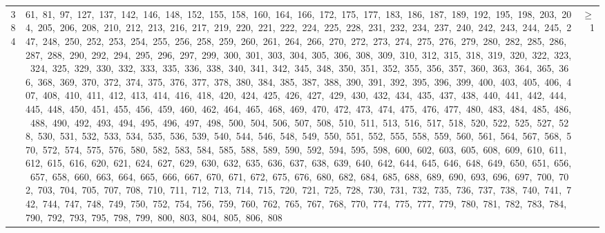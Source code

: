 \begin{longtable}{c|p{}|r}
384 & 61,\ 81,\ 97,\ 127,\ 137,\ 142,\ 146,\ 148,\ 152,\ 155,\ 158,\ 160,\ 164,\ 166,\ 172,\ 175,\ 177,\ 183,\ 186,\ 187,\ 189,\ 192,\ 195,\ 198,\ 203,\ 204,\ 205,\ 206,\ 208,\ 210,\ 212,\ 213,\ 216,\ 217,\ 219,\ 220,\ 221,\ 222,\ 224,\ 225,\ 228,\ 231,\ 232,\ 234,\ 237,\ 240,\ 242,\ 243,\ 244,\ 245,\ 247,\ 248,\ 250,\ 252,\ 253,\ 254,\ 255,\ 256,\ 258,\ 259,\ 260,\ 261,\ 264,\ 266,\ 270,\ 272,\ 273,\ 274,\ 275,\ 276,\ 279,\ 280,\ 282,\ 285,\ 286,\ 287,\ 288,\ 290,\ 292,\ 294,\ 295,\ 296,\ 297,\ 299,\ 300,\ 301,\ 303,\ 304,\ 305,\ 306,\ 308,\ 309,\ 310,\ 312,\ 315,\ 318,\ 319,\ 320,\ 322,\ 323,\ 324,\ 325,\ 329,\ 330,\ 332,\ 333,\ 335,\ 336,\ 338,\ 340,\ 341,\ 342,\ 345,\ 348,\ 350,\ 351,\ 352,\ 355,\ 356,\ 357,\ 360,\ 363,\ 364,\ 365,\ 366,\ 368,\ 369,\ 370,\ 372,\ 374,\ 375,\ 376,\ 377,\ 378,\ 380,\ 384,\ 385,\ 387,\ 388,\ 390,\ 391,\ 392,\ 395,\ 396,\ 399,\ 400,\ 403,\ 405,\ 406,\ 407,\ 408,\ 410,\ 411,\ 412,\ 413,\ 414,\ 416,\ 418,\ 420,\ 424,\ 425,\ 426,\ 427,\ 429,\ 430,\ 432,\ 434,\ 435,\ 437,\ 438,\ 440,\ 441,\ 442,\ 444,\ 445,\ 448,\ 450,\ 451,\ 455,\ 456,\ 459,\ 460,\ 462,\ 464,\ 465,\ 468,\ 469,\ 470,\ 472,\ 473,\ 474,\ 475,\ 476,\ 477,\ 480,\ 483,\ 484,\ 485,\ 486,\ 488,\ 490,\ 492,\ 493,\ 494,\ 495,\ 496,\ 497,\ 498,\ 500,\ 504,\ 506,\ 507,\ 508,\ 510,\ 511,\ 513,\ 516,\ 517,\ 518,\ 520,\ 522,\ 525,\ 527,\ 528,\ 530,\ 531,\ 532,\ 533,\ 534,\ 535,\ 536,\ 539,\ 540,\ 544,\ 546,\ 548,\ 549,\ 550,\ 551,\ 552,\ 555,\ 558,\ 559,\ 560,\ 561,\ 564,\ 567,\ 568,\ 570,\ 572,\ 574,\ 575,\ 576,\ 580,\ 582,\ 583,\ 584,\ 585,\ 588,\ 589,\ 590,\ 592,\ 594,\ 595,\ 598,\ 600,\ 602,\ 603,\ 605,\ 608,\ 609,\ 610,\ 611,\ 612,\ 615,\ 616,\ 620,\ 621,\ 624,\ 627,\ 629,\ 630,\ 632,\ 635,\ 636,\ 637,\ 638,\ 639,\ 640,\ 642,\ 644,\ 645,\ 646,\ 648,\ 649,\ 650,\ 651,\ 656,\ 657,\ 658,\ 660,\ 663,\ 664,\ 665,\ 666,\ 667,\ 670,\ 671,\ 672,\ 675,\ 676,\ 680,\ 682,\ 684,\ 685,\ 688,\ 689,\ 690,\ 693,\ 696,\ 697,\ 700,\ 702,\ 703,\ 704,\ 705,\ 707,\ 708,\ 710,\ 711,\ 712,\ 713,\ 714,\ 715,\ 720,\ 721,\ 725,\ 728,\ 730,\ 731,\ 732,\ 735,\ 736,\ 737,\ 738,\ 740,\ 741,\ 742,\ 744,\ 747,\ 748,\ 749,\ 750,\ 752,\ 754,\ 756,\ 759,\ 760,\ 762,\ 765,\ 767,\ 768,\ 770,\ 774,\ 775,\ 777,\ 779,\ 780,\ 781,\ 782,\ 783,\ 784,\ 790,\ 792,\ 793,\ 795,\ 798,\ 799,\ 800,\ 803,\ 804,\ 805,\ 806,\ 808 & $\ge$ 1 \\

\end{longtable}
